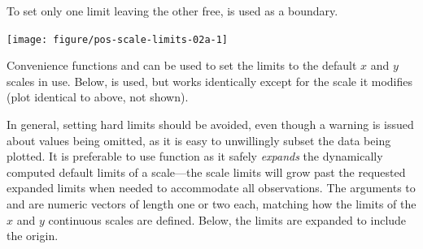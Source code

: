 \documentclass[krantz2]{krantz}\usepackage{knitr}
\begin{document}
To set only one limit leaving the other free,  is used as a boundary.

\begin{knitrout}\footnotesize
{}\color{fgcolor}\begin{kframe}
\begin{alltt}
 \hlkwb{<-} \hlopt{+} \hlstd{(} \hlstd{=} \hlstd{(}\hlstd{,} \hlstd{))}
\end{alltt}
\end{kframe}
\end{knitrout}

\begin{knitrout}\footnotesize
{}\color{fgcolor}\begin{kframe}
\begin{alltt}
 \hlopt{+} 
\end{alltt}


{\ttfamily\noindent\color{warningcolor}{\#\# Warning: Removed 37 rows containing missing values (`geom\_point()`).}}\end{kframe}

{\centering \texttt{[image: figure/pos-scale-limits-02a-1]} 

}


\end{knitrout}

Convenience functions  and  can be used to set the limits to the default $x$ and $y$ scales in use. Below,  is used, but  works identically except for the scale it modifies (plot identical to  above, not shown).

\begin{knitrout}\footnotesize
{}\color{fgcolor}\begin{kframe}
\begin{alltt}
 \hlopt{+}  \hlstd{(}\hlstd{,} \hlstd{)}
\end{alltt}
\end{kframe}
\end{knitrout}

In general, setting hard limits should be avoided, even though a warning is issued about  values being omitted, as it is easy to unwillingly subset the data being plotted.
It is preferable to use function  as it safely \emph{expands} the dynamically computed default limits of a scale---the scale limits will grow past the requested expanded limits when needed to accommodate all observations. The arguments to  and  are numeric vectors of length one or two each, matching how the limits of the $x$ and $y$ continuous scales are defined. Below, the limits are expanded to include the origin.
\end{document}
